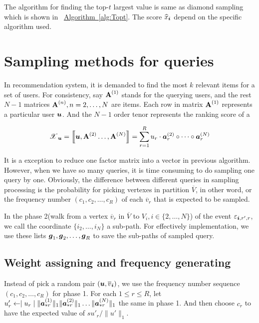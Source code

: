 \documentclass[letterpaper]{article}
\newcommand{\T}[1]{\boldsymbol{\mathscr{\MakeUppercase{#1}}}}
\newcommand{\KT}[1]{\left\llbracket #1 \right\rrbracket}
\newcommand{\V}[1]{{\bm{{\MakeLowercase{#1}}}}}
\newcommand{\VnC}[3]{\V{#1}^{(#2)}_{#3}}
\newcommand{\Vacol}[1]{\V{a}^{(#1)}_{*r}}
\newcommand{\M}[1]{{\bm{\mathbf{\MakeUppercase{#1}}}}}
\newcommand{\Mn}[2]{\M{#1}^{(#2)}}
\newcommand{\norm}[2]{\|#1\|_{#2}}
\newcommand{\Alg}[1] {\hyperref[alg:#1] {Algorithm~\ref*{alg:#1}}}
\begin{document}
The algorithm for finding the top-$t$ largest value is same as diamond sampling which is shown in ~\Alg{Topt}. The score $\widehat{x}_\V{i}$ depend on the specific algorithm used.


\section{Sampling methods for queries}

In recommendation system, it is demanded to find the most $k$ relevant items for a set of users. For consistency, say $\M{A}^{(1)}$ stands for the querying users, and the rest $N-1$ matrices $\M{A}^{(n)},n=2,\ldots,N$ are items. Each row in matrix $\M{A}^{(1)}$ represents a particular user $\V{u}$. And the $N-1$ order tenor represents the ranking score of a 

\begin{equation}\label{eq:RankTensorCP}
\T{X}_{\V{u}}= \KT{ \V{u},\Mn{A}{2}\dots,\Mn{A}{N}} =
\sum_{r=1}^{R} u_r \cdot \VnC{A}{2}{r}\circ \cdots \circ \VnC{A}{N}{r}
\end{equation}

It is a exception to reduce one factor matrix into a vector in previous algorithm. However, when we have so many queries, it is time consuming to do sampling one query by one. Obviously, the difference between different queries in sampling processing is the probability for picking vertexes in partition $\overline{V}$, in other word, or the frequency number $(c_1,c_2,\ldots,c_R)$ of each $\overline{v}_r$ that is expected to be sampled.

In the phase 2(walk from a vertex $\overline{v}_r$ in $\overline{V}$ to $V_i,i\in\{2,\ldots,N\}$) of the event $\varepsilon_{\V{i},r',r}$, we call the coordinate $\{i_2,\ldots,i_N\}$ a sub-path. For effectively implementation, we use these lists $\V{g}_1,\V{g}_2,\ldots,\V{g}_R$ to save the sub-paths of sampled query.


\subsection{Weight assigning and frequency generating}
Instead of pick a random pair $(\V{u},\overline{v}_{\V{i}})$, we use the frequency number sequence $(c_1,c_2,\ldots,c_R)$ for phase 1. For each $1 \leq r \leq R$, let $u'_r \leftarrow \mid u_r\mid \norm{\Vacol{1}}{1} \norm{\Vacol{2}}{1} \ldots \norm{\Vacol{N}}{1}$ the same in phase 1.
And then choose $c_r$ to have the expected value of $su'_r/\norm{u'}{1}$.
\end{document}
